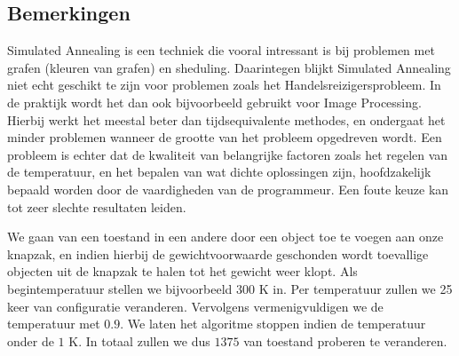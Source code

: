 \subsection{Bemerkingen}
Simulated Annealing is een techniek die vooral intressant is bij problemen met grafen (kleuren van grafen) en sheduling. Daarintegen blijkt Simulated Annealing niet echt geschikt te zijn voor problemen zoals het Handelsreizigersprobleem. In de praktijk wordt het dan ook bijvoorbeeld gebruikt voor Image Processing. Hierbij werkt het meestal beter dan tijdsequivalente methodes, en ondergaat het minder problemen wanneer de grootte van het probleem opgedreven wordt. Een probleem is echter dat de kwaliteit van belangrijke factoren zoals het regelen van de temperatuur, en het bepalen van wat dichte oplossingen zijn, hoofdzakelijk bepaald worden door de vaardigheden van de programmeur. Een foute keuze kan tot zeer slechte resultaten leiden.
\begin{leftbar}
We gaan van een toestand in een andere door een object toe te voegen aan onze knapzak, en indien hierbij de gewichtvoorwaarde geschonden wordt toevallige objecten uit de knapzak te halen tot het gewicht weer klopt. Als begintemperatuur stellen we bijvoorbeeld $300\mbox{ K}$ in. Per temperatuur zullen we 25 keer van configuratie veranderen. Vervolgens vermenigvuldigen we de temperatuur met $0.9$. We laten het algoritme stoppen indien de temperatuur onder de $1\mbox{ K}$. In totaal zullen we dus $1375$ van toestand proberen te veranderen.
\end{leftbar}
